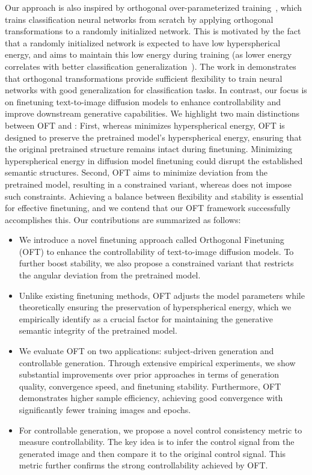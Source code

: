Our approach is also inspired by orthogonal over-parameterized training~\cite{liu2021orthogonal}, which trains classification neural networks from scratch by applying orthogonal transformations to a randomly initialized network. This is motivated by the fact that a randomly initialized network is expected to have low hyperspherical energy, and \cite{liu2021orthogonal} aims to maintain this low energy during training (as lower energy correlates with better classification generalization~\cite{liu2018learning,lin2020regularizing}). The work in \cite{liu2021orthogonal} demonstrates that orthogonal transformations provide sufficient flexibility to train neural networks with good generalization for classification tasks. In contrast, our focus is on finetuning text-to-image diffusion models to enhance controllability and improve downstream generative capabilities. We highlight two main distinctions between OFT and \cite{liu2021orthogonal}: First, whereas \cite{liu2021orthogonal} minimizes hyperspherical energy, OFT is designed to preserve the pretrained model’s hyperspherical energy, ensuring that the original pretrained structure remains intact during finetuning. Minimizing hyperspherical energy in diffusion model finetuning could disrupt the established semantic structures. Second, OFT aims to minimize deviation from the pretrained model, resulting in a constrained variant, whereas \cite{liu2021orthogonal} does not impose such constraints. Achieving a balance between flexibility and stability is essential for effective finetuning, and we contend that our OFT framework successfully accomplishes this. Our contributions are summarized as follows:

\begin{itemize}[leftmargin=*,nosep]

    \item We introduce a novel finetuning approach called Orthogonal Finetuning (OFT) to enhance the controllability of text-to-image diffusion models. To further boost stability, we also propose a constrained variant that restricts the angular deviation from the pretrained model.
    \item Unlike existing finetuning methods, OFT adjusts the model parameters while theoretically ensuring the preservation of hyperspherical energy, which we empirically identify as a crucial factor for maintaining the generative semantic integrity of the pretrained model.
    \item We evaluate OFT on two applications: subject-driven generation and controllable generation. Through extensive empirical experiments, we show substantial improvements over prior approaches in terms of generation quality, convergence speed, and finetuning stability. Furthermore, OFT demonstrates higher sample efficiency, achieving good convergence with significantly fewer training images and epochs.
    \item For controllable generation, we propose a novel control consistency metric to measure controllability. The key idea is to infer the control signal from the generated image and then compare it to the original control signal. This metric further confirms the strong controllability achieved by OFT.
\end{itemize}

